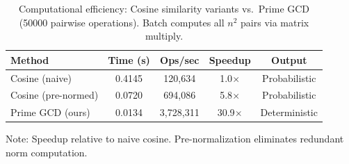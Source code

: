 \begin{table}[h]
\centering
\caption{Computational efficiency: Cosine similarity variants vs.\ Prime GCD (50000 pairwise operations). Batch computes all $n^2$ pairs via matrix multiply.}
\label{tab:timing}
\begin{tabular}{lcccc}
\toprule
Method & Time (s) & Ops/sec & Speedup & Output \\
\midrule
Cosine (naive) & 0.4145 & 120,634 & 1.0$\times$ & Probabilistic \\
Cosine (pre-normed) & 0.0720 & 694,086 & 5.8$\times$ & Probabilistic \\
Prime GCD (ours) & 0.0134 & 3,728,311 & 30.9$\times$ & Deterministic \\
\bottomrule
\end{tabular}
\vspace{2pt}
\small{Note: Speedup relative to naive cosine. Pre-normalization eliminates redundant norm computation.}
\end{table}
